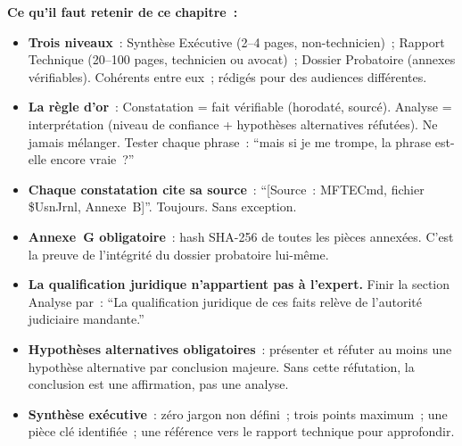 \begin{boxresume}
\textbf{Ce qu'il faut retenir de ce chapitre~:}
\begin{itemize}
    \item \textbf{Trois niveaux}~: Synthèse Exécutive (2--4 pages,
          non-technicien)~; Rapport Technique (20--100 pages, technicien
          ou avocat)~; Dossier Probatoire (annexes vérifiables).
          Cohérents entre eux~; rédigés pour des audiences différentes.

    \item \textbf{La règle d'or}~: Constatation = fait vérifiable
          (horodaté, sourcé). Analyse = interprétation (niveau de
          confiance + hypothèses alternatives réfutées). Ne jamais
          mélanger. Tester chaque phrase~: ``mais si je me trompe,
          la phrase est-elle encore vraie~?''

    \item \textbf{Chaque constatation cite sa source}~: ``[Source~:
          MFTECmd, fichier \$UsnJrnl, Annexe~B]''. Toujours. Sans
          exception.

    \item \textbf{Annexe~G obligatoire}~: hash SHA-256 de toutes les
          pièces annexées. C'est la preuve de l'intégrité du dossier
          probatoire lui-même.

    \item \textbf{La qualification juridique n'appartient pas à l'expert.}
          Finir la section Analyse par~: ``La qualification juridique
          de ces faits relève de l'autorité judiciaire mandante.''

    \item \textbf{Hypothèses alternatives obligatoires}~: présenter et
          réfuter au moins une hypothèse alternative par conclusion
          majeure. Sans cette réfutation, la conclusion est une
          affirmation, pas une analyse.

    \item \textbf{Synthèse exécutive}~: zéro jargon non défini~;
          trois points maximum~; une pièce clé identifiée~;
          une référence vers le rapport technique pour approfondir.
\end{itemize}
\end{boxresume}

\bigskip

